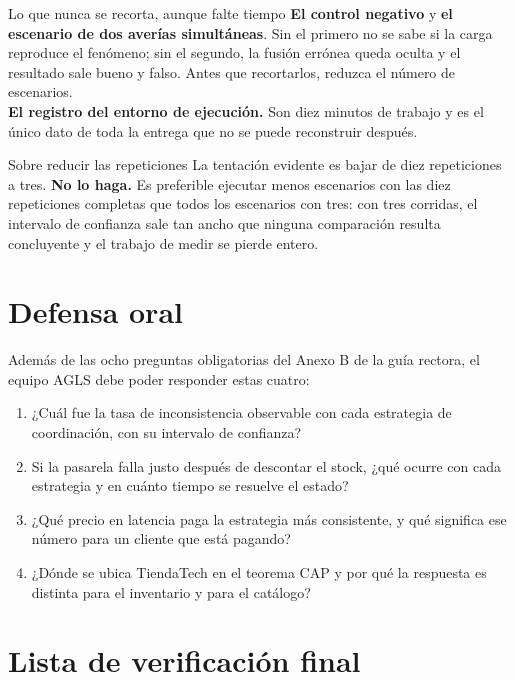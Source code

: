 \documentclass[11pt,a4paper]{article}
\begin{document}
\begin{pisoBox}{Lo que nunca se recorta, aunque falte tiempo}
	\textbf{El control negativo} y \textbf{el escenario de dos averías simultáneas}. Sin el primero no se sabe si la carga reproduce el fenómeno; sin el segundo, la fusión errónea queda oculta y el resultado sale bueno y falso. Antes que recortarlos, reduzca el número de escenarios.\\[5pt]
	\textbf{El registro del entorno de ejecución.} Son diez minutos de trabajo y es el único dato de toda la entrega que no se puede reconstruir después.
\end{pisoBox}

\begin{avisoBox}{Sobre reducir las repeticiones}
	La tentación evidente es bajar de diez repeticiones a tres. \textbf{No lo haga.} Es preferible ejecutar menos escenarios con las diez repeticiones completas que todos los escenarios con tres: con tres corridas, el intervalo de confianza sale tan ancho que ninguna comparación resulta concluyente y el trabajo de medir se pierde entero.
\end{avisoBox}

\section{Defensa oral}

Además de las ocho preguntas obligatorias del Anexo B de la guía rectora, el equipo AGLS debe poder responder estas cuatro:

\begin{enumerate}[leftmargin=*,itemsep=3pt]
	\item ¿Cuál fue la tasa de inconsistencia observable con cada estrategia de coordinación, con su intervalo de confianza?
	\item Si la pasarela falla justo después de descontar el stock, ¿qué ocurre con cada estrategia y en cuánto tiempo se resuelve el estado?
	\item ¿Qué precio en latencia paga la estrategia más consistente, y qué significa ese número para un cliente que está pagando?
	\item ¿Dónde se ubica TiendaTech en el teorema CAP y por qué la respuesta es distinta para el inventario y para el catálogo?
\end{enumerate}

\section{Lista de verificación final}
\end{document}
